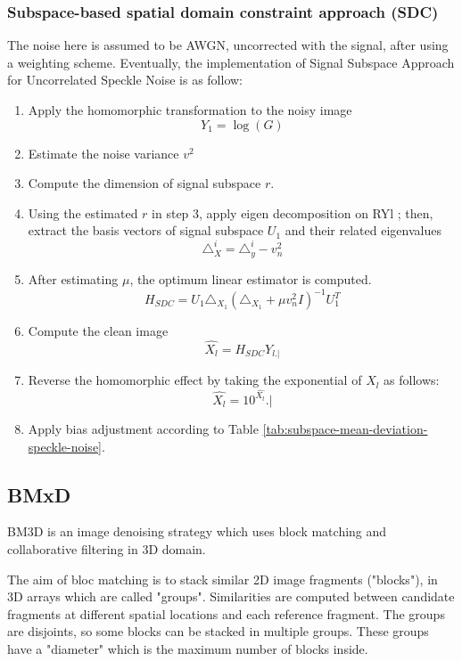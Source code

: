 \subsubsection{Subspace-based spatial domain constraint approach (SDC)}
The noise here is assumed to be AWGN, uncorrected with the signal, after using a weighting scheme. Eventually, the implementation of Signal Subspace Approach for Uncorrelated Speckle Noise is as follow:
\begin{enumerate}
\item Apply the homomorphic transformation to the noisy image
\begin{equation}
	Y_1=\log(G)
\end{equation}
\item Estimate the noise variance $v^{2}$
\item Compute the dimension of signal subspace $r$.
\item Using the estimated $r$ in step 3, apply eigen decomposition on RYl ; then, extract
the basis vectors of signal subspace $U_1$ and their related eigenvalues
\begin{equation}
	\triangle _X^i = \triangle _y^i-v_n^2
\end{equation}
\item After estimating $\mu$, the optimum linear estimator is computed.
\begin{equation}
	H_{SDC}= U_{1}\triangle _{X_1}(\triangle _{X_1}+\mu v_n^2I)^{-1}U_1^T
\end{equation}
\item Compute the clean image
\begin{equation}
	\hat{X_{l}}=H_{SDC}Y_{l.|}
\end{equation}
\item Reverse the homomorphic effect by taking the exponential of $X_l$ as follows:
\begin{equation}
\hat{X_{l}}=10^{\hat{X_{l}}}.|
\end{equation}
\item Apply bias adjustment according to Table \ref{tab:subspace-mean-deviation-speckle-noise}.
\end{enumerate}

\subsection{BMxD}
BM3D is an image denoising strategy which uses block matching and collaborative filtering in 3D domain.

The aim of bloc matching is to stack similar 2D image fragments ("blocks"), in 3D arrays which are called "groups". Similarities are computed between candidate fragments at different spatial locations and each reference fragment. The groups are disjoints, so some blocks can be stacked in multiple groups. These groups have a "diameter" which is the maximum number of blocks inside.

